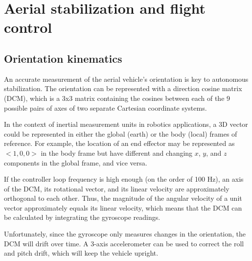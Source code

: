 \documentclass[12pt,letterpaper]{article}
\begin{document}

\section{Aerial stabilization and flight control}

\subsection{Orientation kinematics}

An accurate measurement of the aerial vehicle's orientation is key to
autonomous stabilization. The orientation can be represented with a direction
cosine matrix (DCM), which is a 3x3 matrix containing the cosines between each
of the 9 possible pairs of axes of two separate Cartesian coordinate systems.

In the context of inertial measurement units in robotics applications, a 3D
vector could be represented in either the global (earth) or the body (local)
frames of reference. For example, the location of an end effector may be
represented as $<1, 0, 0>$ in the body frame but have different and changing
$x$, $y$, and $z$ components in the global frame, and vice versa.

If the controller loop frequency is high enough (on the order of 100 Hz), an
axis of the DCM, its rotational vector, and its linear velocity are
approximately orthogonal to each other. Thus, the magnitude of the angular
velocity of a unit vector approximately equals its linear velocity, which means
that the DCM can be calculated by integrating the gyroscope readings.

Unfortunately, since the gyroscope only measures changes in the orientation,
the DCM will drift over time. A 3-axis accelerometer can be used to correct the
roll and pitch drift, which will keep the vehicle upright.
\end{document}
